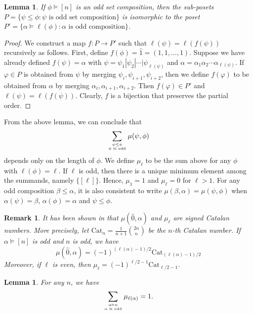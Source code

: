 \documentclass[11pt]{amsart}
\newtheorem{Lemma}[Theorem]{Lemma}
\newtheorem{Remark}[Theorem]{Remark}
\numberwithin{equation}{section}
\newcommand{\Cat}{\mathrm{Cat}}
\newcommand{\FA}[1]{\textcolor{red}{#1}}
\begin{document}
\begin{Lemma}\label{lem:poset}
	If $\phi\vDash[n]$ is an odd set composition, then the sub-posets $P=\{\psi\leq\phi:\psi\text{ is odd set composition}\}$ is isomorphic to the poset $P'=\{\alpha\vDash \ell(\phi):\alpha\text{ is odd composition}\}$.
\end{Lemma}

\begin{proof}
	We construct a map $f:P\to P'$ such that $\ell(\psi)=\ell(f(\psi))$ recursively as follows. First, define $f(\phi)=\hat{1}=(1,1,\dots,1)$. Suppose we have already defined $f(\psi)=\alpha$ with $\psi=\psi_1|\psi_2|\cdots|\psi_{\ell(\psi)}$ and $\alpha=\alpha_1\alpha_2\cdots\alpha_{\ell(\psi)}$. If $\varphi\in P$ is obtained from $\psi$ by merging $\psi_i,\psi_{i+1},\psi_{i+2}$, then we define $f(\varphi)$ to be obtained from $\alpha$ by merging $\alpha_i,\alpha_{i+1},\alpha_{i+2}$. Then $f(\varphi)\in P'$ and $\ell(\psi)=\ell(f(\psi))$. Clearly, $f$ is a bijection that preserves the partial order.
\end{proof}

From the above lemma, we can conclude that $$\displaystyle \sum_{\psi\leq\phi \atop \psi\text{ is odd}}\mu(\psi,\phi)$$ depends only on the length of $\phi$. We define $\mu_\ell$ to be the sum above for any $\phi$ with $\ell(\phi)=\ell$. 
If $\ell$ is odd, then there is a unique minimum element among the summands, namely $\{[\ell]\}$. Hence, $\mu_1=1$ and $\mu_\ell=0$ for $\ell>1$. For any odd composition $\beta\leq\alpha$, it is also consistent to write $\mu(\beta,\alpha)=\mu(\psi,\phi)$ when $\alpha(\psi)=\beta$, $\alpha(\phi)=\alpha$ and $\psi\leq\phi$.

\begin{Remark}
	It has been shown in \cite[Corollary 1.4 and Theorem 2.5]{C15}  that $\mu(\hat{0},\alpha)$ and $\mu_\ell$ are signed Catalan numbers. More precisely, let $\Cat_n=\frac{1}{n+1}\binom{2n}{n}$ be the $n$-th Catalan number. If $\alpha\models[n]$ is odd and $n$ is odd, we have
	$$\mu(\hat{0},\alpha)=(-1)^{(\ell(\alpha)-1)/2}\Cat_{(\ell(\alpha)-1)/2}$$
	Moreover, if $\ell$ is even, then $\mu_\ell=(-1)^{\ell/2-1}\Cat_{\ell/2-1}$.
\end{Remark}

\begin{Lemma}\label{lem:case1}
	For any $n$, we have
	$$\sum_{\alpha\vDash n \atop \alpha\text{ is odd}}\mu_{\ell(\alpha)}=1.$$
\end{Lemma}
\end{document}
